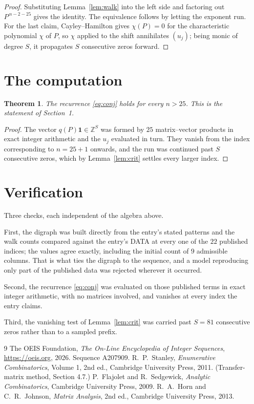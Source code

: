 \documentclass[11pt,a4paper]{article}
\theoremstyle{plain}
\newtheorem{theorem}{Theorem}
\theoremstyle{definition}
\begin{document}
\begin{proof}
Substituting Lemma~\ref{lem:walk} into the left side and factoring out
$P^{\,n-2-25}$ gives the identity. The equivalence follows by letting the exponent
run. For the last claim, Cayley--Hamilton gives $\chi(P)=0$ for the characteristic
polynomial $\chi$ of $P$, so $\chi$ applied to the shift annihilates $(u_j)$; being monic of
degree $S$, it propagates $S$ consecutive zeros forward.
\end{proof}

\section{The computation}

\begin{theorem}
The recurrence \eqref{eq:conj} holds for every $n>25$. This is the statement of
Section~1.
\end{theorem}

\begin{proof}
The vector $q(P)\mathbf{1}\in\mathbb{Z}^{S}$ was formed by $25$ matrix--vector
products in exact integer arithmetic and the $u_j$ evaluated in turn. They vanish from the
index corresponding to $n=25+1$ onwards, and the run was continued past $S$ consecutive
zeros, which by Lemma~\ref{lem:crit} settles every larger index.
\end{proof}

\section{Verification}

Three checks, each independent of the algebra above.

First, the digraph was built directly from the entry's stated patterns and the walk counts
compared against the entry's DATA at every one of the $22$ published indices; the
values agree exactly, including the initial count of $9$ admissible columns. That is
what ties the digraph to the sequence, and a model reproducing only part of the published
data was rejected wherever it occurred.

Second, the recurrence \eqref{eq:conj} was evaluated on those published terms in exact
integer arithmetic, with no matrices involved, and vanishes at every index the entry claims.

Third, the vanishing test of Lemma~\ref{lem:crit} was carried past $S=81$ consecutive
zeros rather than to a sampled prefix.

\begin{thebibliography}{9}
 The OEIS Foundation, \emph{The On-Line Encyclopedia of Integer
Sequences}, \url{https://oeis.org}, 2026. Sequence A207909.
 R.~P.~Stanley, \emph{Enumerative Combinatorics}, Volume 1, 2nd ed.,
Cambridge University Press, 2011. (Transfer-matrix method, Section 4.7.)
 P.~Flajolet and R.~Sedgewick, \emph{Analytic Combinatorics}, Cambridge
University Press, 2009.
 R.~A.~Horn and C.~R.~Johnson, \emph{Matrix Analysis}, 2nd ed., Cambridge
University Press, 2013.
\end{thebibliography}
\end{document}

